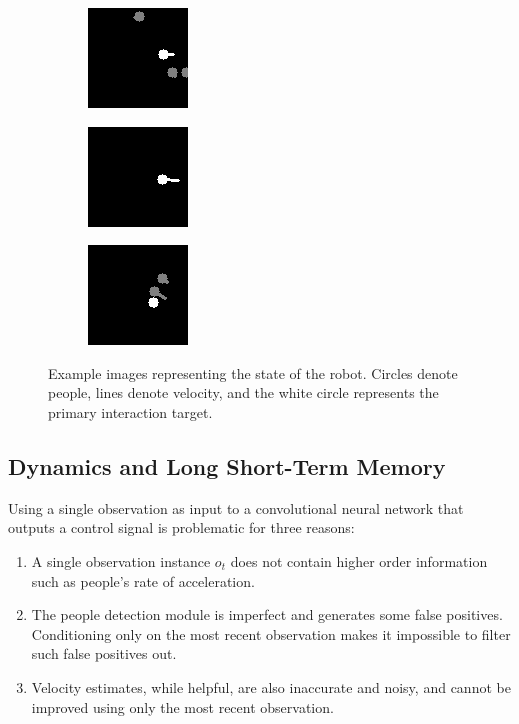 \documentclass[letterpaper, 10 pt, conference]{ieeeconf}
\begin{document}
  	\begin{figure}[tbh]
  	\centering
      \begin{subfigure}[b]{0.30\columnwidth}
    \includegraphics[scale = 0.80]{images/state1.png}
    \label{fig:state1}
  \end{subfigure}
  \begin{subfigure}[b]{0.30\columnwidth}
    \includegraphics[scale = 0.80]{images/state2.png}
       \label{fig:state2}
  \end{subfigure} 
    \begin{subfigure}[b]{0.30\columnwidth}
    \includegraphics[scale = 0.80]{images/state3.png}
       \label{fig:state3}
  \end{subfigure}
  \caption{Example images representing the state of the robot. Circles denote people, lines denote velocity, and the white circle represents the primary interaction target.}

    \vspace{-2mm}
  \label{fig:state}
  \end{figure}

\subsection{Dynamics and Long Short-Term Memory}
Using a single observation as input to a convolutional neural network that outputs a control signal is problematic for three reasons:

\begin{enumerate}
\item A single observation instance $o_t$ does not contain higher order information such as people's rate of  acceleration.
\item The people detection module is imperfect and generates some false positives.  Conditioning only on the most recent observation makes it impossible to filter such false positives out.
\item Velocity estimates, while helpful, are also inaccurate and noisy, and cannot be improved using only the most recent observation.
\end{enumerate}
\end{document}
